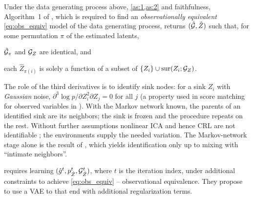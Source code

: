 \begin{theorem}\label{thm:ng}
Under the data generating process above, \cref{as:1,as:2} and faithfulness, Algorithm~1 of 
\cite{ng2025}, which is required to find an \textit{observationally equivalent} \cref{eq:obs_equiv}  
model of the data generating process, returns $(\hat{\mathcal{G}},\hat Z)$ such that, for some permutation 
$\pi$ of the estimated latents, 
\begin{enumerate*}[label=(\roman*)]
\item $\hat{\mathcal{G}}_\pi$ and $\mathcal{G}_Z$ are identical, and 
\item each $\hat Z_{\pi(i)}$ is solely a function of a subset of
$\{Z_i\}\cup\mathrm{sur}(Z_i;\mathcal{G}_Z)$.
\end{enumerate*}
\end{theorem}

The role of the third derivatives is to identify sink nodes: for a sink $Z_i$ with \textit{Gaussian}
noise, $\partial^3\log p/\partial Z_i^2\partial Z_j=0$ for all $j$ \cite{ng2025} (a property used in
score matching for observed variables in \cite{rolland2022}). With the Markov network known, the parents
of an identified sink are its neighbors; the sink is frozen and the procedure repeats on the rest.
Without further assumptions nonlinear ICA and hence CRL are not identifiable \cite{hyvarinen1999};
the environments supply the needed variation. The Markov-network stage alone is the result of
\cite{zhang2024}, which yields identification only up to mixing with ``intimate neighbors''.

\cite[Algorithm~1]{ng2025} requires learning $(\hat g^t, p^t_{\hat Z}, \mathcal{G}^t_{\hat Z})$, where $t$ is 
the iteration index, under additional constraints to achieve \cref{eq:obs_equiv} -- observational 
equivalence. They propose to use a VAE to that end with additional regularization terms. 

